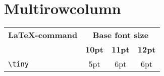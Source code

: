 \documentclass[10pt, a4paper]{article}
\begin{document}
\section{Multirowcolumn}

\begin{tabular}{lccc}
\hline
\textbf{\LaTeX-command} & \multicolumn{3}{c}{\textbf{Base font size}}\\
\cline{2-4} & \textbf{10pt} & \textbf{11pt} & \textbf{12pt}\\
\verb_\tiny_ & 5pt & 6pt & 6pt\\
\hline
\end{tabular}
\end{document}
